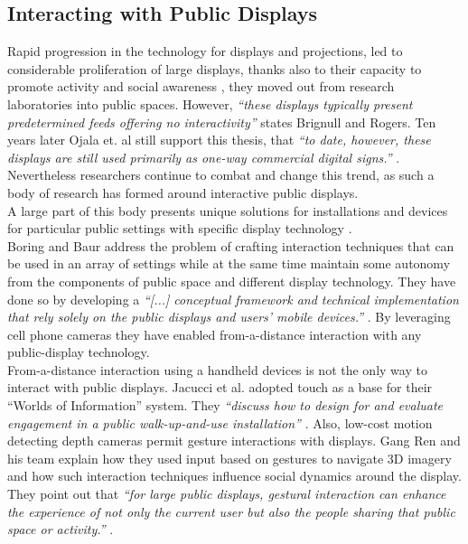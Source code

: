 \subsection{Interacting with Public Displays}
Rapid progression in the technology for displays and projections, led to considerable proliferation of large displays, thanks also to their capacity to promote activity and social awareness \cite{Huang:2003}, they moved out from research laboratories into public spaces. 
However, \emph{``these displays typically present predetermined feeds offering no interactivity''} \cite{Brignull:2003} states Brignull and Rogers. 
Ten years later Ojala et. al still support this thesis, that \emph{``to date, however, these displays are still used primarily as one-way commercial digital signs.''} \cite{Ojala:2012:MIP:2225044.2225065}. \\

Nevertheless researchers continue to combat and change this trend, as such a body of research has formed around interactive public displays. \\

A large part of this body presents unique  solutions for installations and devices for particular public settings with specific display technology \cite{Schieck:2012:AEM:2393132.2393141}.\\

Boring and Baur address the problem of crafting interaction techniques that can be used in an array of settings while at the same time maintain some autonomy from the components of public space and different display technology. %
They have done so by developing a \emph{``[...] conceptual framework and technical implementation that rely solely on the public displays and users' mobile devices.''} \cite{Boring:2013}. By  leveraging cell phone cameras they have enabled from-a-distance interaction with any public-display technology.\\

From-a-distance interaction using a handheld devices is not the only way to interact with public displays. 
Jacucci et al. adopted touch as a base for their ``Worlds of Information'' system. 
They \emph{``discuss how to design for and evaluate engagement in a public walk-up-and-use installation''} \cite{Jacucci:2010}. 
Also, low-cost motion detecting depth cameras permit gesture interactions with displays. 
Gang Ren and his team explain how they used input based on gestures to navigate 3D imagery and how such interaction techniques influence social dynamics around the display. 
They point out that\emph{ ``for large public displays, gestural interaction can enhance the experience of not only the current user but also the people sharing that public space or activity.''} \cite{Ren:2013}.\\

